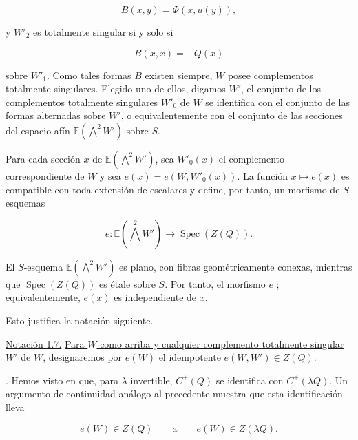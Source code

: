 \pageoriginale

\begin{equation*}
B(x,y)=\Phi(x,u(y)),
\end{equation*}

y $W'_2$ es totalmente singular si y solo si

\begin{equation*}
B(x,x)=-Q(x)
\end{equation*}

sobre $W'_1$. Como tales formas $B$ existen siempre, $W$ posee
complementos totalmente singulares. Elegido uno de ellos, digamos $W'$, el
conjunto de los complementos totalmente singulares $W'_0$ de $W$ se
identifica con el conjunto de las formas alternadas sobre $W'$, o
equivalentemente con el conjunto de las secciones del espacio afín
$\mathbb E(\bigwedge^2W')$ sobre $S$.

Para cada sección $x$ de $\mathbb E(\bigwedge^2W')$, sea $W'_0(x)$ el
complemento correspondiente de $W$ y sea $e(x)=e(W,W'_0(x))$. La función
$x\mapsto e(x)$ es compatible con toda extensión de escalares y define,
por tanto, un morfismo de $S$-esquemas

\begin{equation*}
e:\mathbb E(\bigwedge^2W')\longrightarrow
\operatorname{Spec}(Z(Q)).
\end{equation*}

El $S$-esquema $\mathbb E(\bigwedge^2W')$ es plano, con fibras
geométricamente conexas, mientras que $\operatorname{Spec}(Z(Q))$ es
étale sobre $S$. Por tanto, el morfismo $e$
;
equivalentemente, $e(x)$ es independiente de $x$.


Esto justifica la notación siguiente.

\medskip
\noindent\underline{Notación 1.7.}\quad
\underline{Para $W$ como arriba y cualquier complemento totalmente
singular $W'$ de $W$, designaremos por $e(W)$ el idempotente
$e(W,W')\in Z(Q)$.}

\medskip
{}. Hemos visto en  que, para $\lambda$
invertible, $C^+(Q)$ se identifica con $C^+(\lambda Q)$. Un argumento de
continuidad análogo al precedente muestra que esta identificación lleva

\begin{equation*}
e(W)\in Z(Q)\qquad\text{a}\qquad e(W)\in Z(\lambda Q).
\end{equation*}


